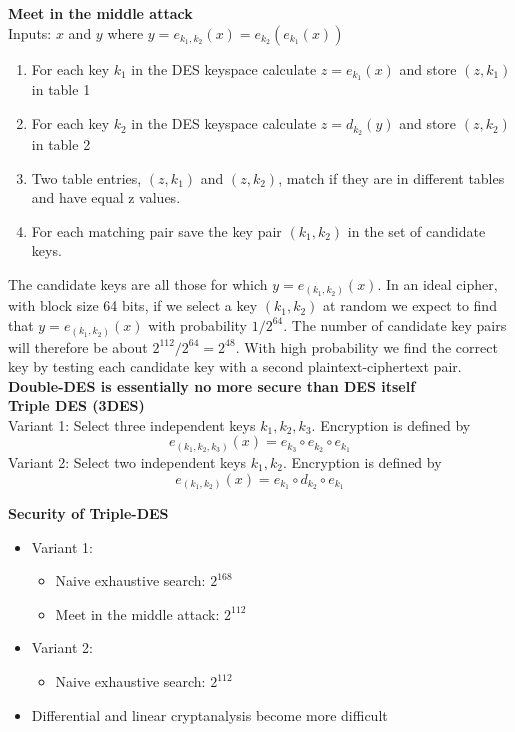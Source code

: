 \textbf{Meet in the middle attack}\\
Inputs: $x$ and $y$ where $y = e_{k_1,k_2}(x) = e_{k_2}(e_{k_1}(x))$
\begin{enumerate}
    \item For each key $k_1$ in the DES keyspace calculate $z = e_{k_1}(x)$ and store $(z,k_1)$ in table 1
    \item For each key $k_2$ in the DES keyspace calculate $z = d_{k_2}(y)$ and store $(z,k_2)$ in table 2
    \item Two table entries, $(z, k_1)$ and $(z, k_2)$,
        match if they are in different tables and have equal z values.
    \item For each matching pair save the key pair $(k_1,k_2)$ in the set of candidate keys.
\end{enumerate}
The candidate keys are all those for which $y = e_{(k_1,k_2)}(x)$.
In an ideal cipher, with block size 64 bits, if we select a key $(k_1, k_2)$ at random we expect
to find that $y = e_{(k_1,k_2)}(x)$ with probability $1/2^{64}$.
The number of candidate key pairs will therefore be about $2^{112}/2^{64} = 2^{48}$.
With high probability we find the correct key by testing each candidate key with a second plaintext-ciphertext pair.\\

\textbf{Double-DES is essentially no more secure than DES itself}\\

\textbf{Triple DES (3DES)}\\
Variant 1: Select three independent keys $k_1, k_2, k_3$. Encryption is defined by
$$e_{(k_1, k_2, k_3)}(x) = e_{k_3} \circ e_{k_2} \circ e_{k_1}$$
Variant 2: Select two independent keys $k_1, k_2$. Encryption is defined by
$$e_{(k_1, k_2)}(x) = e_{k_1} \circ d_{k_2} \circ e_{k_1}$$

\textbf{Security of Triple-DES}
\begin{itemize}
    \item Variant 1:
        \begin{itemize}
            \item Naive exhaustive search: $2^{168}$
            \item Meet in the middle attack: $2^{112}$
        \end{itemize}
    \item Variant 2:
        \begin{itemize}
            \item Naive exhaustive search: $2^{112}$
        \end{itemize}
    \item Differential and linear cryptanalysis become more difficult
\end{itemize}

